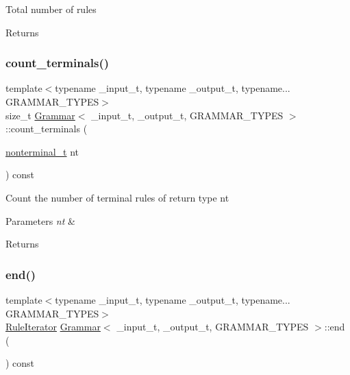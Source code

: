 Total number of rules \begin{DoxyReturn}{Returns}

\end{DoxyReturn}
\mbox{\label{class_grammar_a44c81f50a71a83e95b558d32fa1715c4}} 
\subsubsection{\texorpdfstring{count\+\_\+terminals()}{count\_terminals()}}
{\footnotesize\ttfamily template$<$typename \+\_\+input\+\_\+t, typename \+\_\+output\+\_\+t, typename... G\+R\+A\+M\+M\+A\+R\+\_\+\+T\+Y\+P\+ES$>$ \\
size\+\_\+t \hyperlink{class_grammar}{Grammar}$<$ \+\_\+input\+\_\+t, \+\_\+output\+\_\+t, G\+R\+A\+M\+M\+A\+R\+\_\+\+T\+Y\+P\+ES $>$\+::count\+\_\+terminals (\begin{DoxyParamCaption}\item[{\hyperlink{_nonterminal_8h_a1c5bfe9b903f69c83bbde5da7035fef3}{nonterminal\+\_\+t}}]{nt }\end{DoxyParamCaption}) const\hspace{0.3cm}{\ttfamily [inline]}}

Count the number of terminal rules of return type nt 
\begin{DoxyParams}{Parameters}
{\em nt} & \\
\hline
\end{DoxyParams}
\begin{DoxyReturn}{Returns}

\end{DoxyReturn}
\mbox{\label{class_grammar_a141508d214bb721b71e8ee27a1aa2915}} 
\subsubsection{\texorpdfstring{end()}{end()}}
{\footnotesize\ttfamily template$<$typename \+\_\+input\+\_\+t, typename \+\_\+output\+\_\+t, typename... G\+R\+A\+M\+M\+A\+R\+\_\+\+T\+Y\+P\+ES$>$ \\
\hyperlink{class_grammar_1_1_rule_iterator}{Rule\+Iterator} \hyperlink{class_grammar}{Grammar}$<$ \+\_\+input\+\_\+t, \+\_\+output\+\_\+t, G\+R\+A\+M\+M\+A\+R\+\_\+\+T\+Y\+P\+ES $>$\+::end (\begin{DoxyParamCaption}{ }\end{DoxyParamCaption}) const\hspace{0.3cm}{\ttfamily [inline]}}

